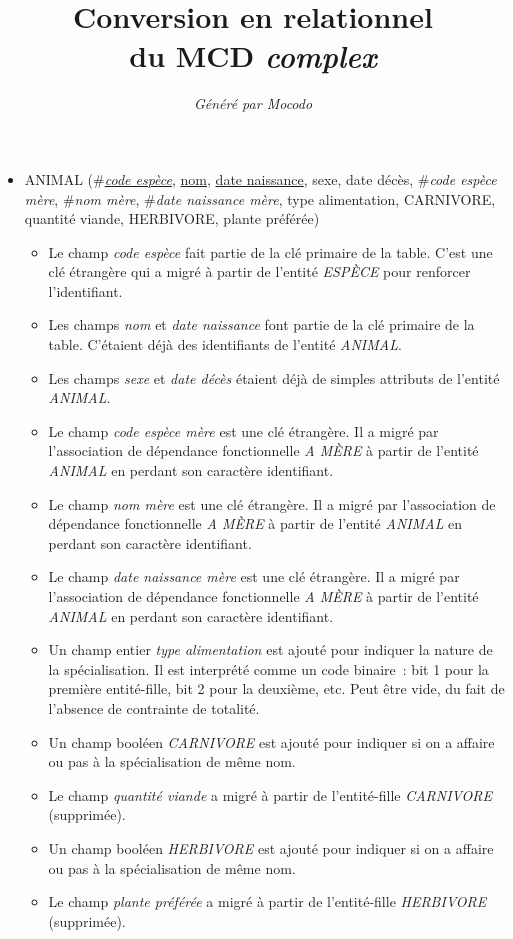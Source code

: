 \documentclass[a4paper]{article}
\title{Conversion en relationnel\\du MCD \emph{complex}}
\author{\emph{Généré par Mocodo}}
\newcommand{\relat}[1]{\textsc{#1}}
\newcommand{\attr}[1]{#1}
\newcommand{\prim}[1]{\uline{#1}}
\newcommand{\foreign}[1]{\#\textsl{#1}}
\begin{document}
\maketitle

\begin{itemize}
  \item \relat{ANIMAL} (\foreign{\prim{code espèce}}, \prim{nom}, \prim{date naissance}, \attr{sexe}, \attr{date décès}, \foreign{code espèce mère}, \foreign{nom mère}, \foreign{date naissance mère}, \attr{type alimentation}, \attr{CARNIVORE}, \attr{quantité viande}, \attr{HERBIVORE}, \attr{plante préférée})
  \begin{itemize}
    \item Le champ \emph{code espèce} fait partie de la clé primaire de la table. C'est une clé étrangère qui a migré à partir de l'entité \emph{ESPÈCE} pour renforcer l'identifiant.
    \item Les champs \emph{nom} et \emph{date naissance} font partie de la clé primaire de la table. C'étaient déjà des identifiants de l'entité \emph{ANIMAL}.
    \item Les champs \emph{sexe} et \emph{date décès} étaient déjà de simples attributs de l'entité \emph{ANIMAL}.
    \item Le champ \emph{code espèce mère} est une clé étrangère. Il a migré par l'association de dépendance fonctionnelle \emph{A MÈRE} à partir de l'entité \emph{ANIMAL} en perdant son caractère identifiant.
    \item Le champ \emph{nom mère} est une clé étrangère. Il a migré par l'association de dépendance fonctionnelle \emph{A MÈRE} à partir de l'entité \emph{ANIMAL} en perdant son caractère identifiant.
    \item Le champ \emph{date naissance mère} est une clé étrangère. Il a migré par l'association de dépendance fonctionnelle \emph{A MÈRE} à partir de l'entité \emph{ANIMAL} en perdant son caractère identifiant.
    \item Un champ entier \emph{type alimentation} est ajouté pour indiquer la nature de la spécialisation. Il est interprété comme un code binaire : bit 1 pour la première entité-fille, bit 2 pour la deuxième, etc. Peut être vide, du fait de l'absence de contrainte de totalité.
    \item Un champ booléen \emph{CARNIVORE} est ajouté pour indiquer si on a affaire ou pas à la spécialisation de même nom.
    \item Le champ \emph{quantité viande} a migré à partir de l'entité-fille \emph{CARNIVORE} (supprimée).
    \item Un champ booléen \emph{HERBIVORE} est ajouté pour indiquer si on a affaire ou pas à la spécialisation de même nom.
    \item Le champ \emph{plante préférée} a migré à partir de l'entité-fille \emph{HERBIVORE} (supprimée).
  \end{itemize}


\end{itemize}
\end{document}
